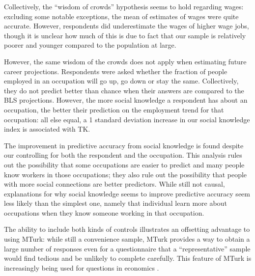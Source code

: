 \documentclass[12pt]{article}
\begin{document}
Collectively, the ``wisdom of crowds'' hypothesis seems to hold regarding wages: 
excluding some notable exceptions, the mean of estimates of wages were quite accurate. 
However, respondents did underestimate the wages of higher wage jobs,
though it is unclear how much of this is due to fact that our sample is relatively poorer and younger compared to the population at large. 


However, the same wisdom of the crowds does not apply when estimating future career projections.
Respondents were asked whether the fraction of people employed in an occupation will go up, go down or stay the same. 
Collectively, they do not predict better than chance when their answers are compared to the BLS projections. 
However, the more social knowledge a respondent has about an occupation, the better their prediction on the employment trend for that occupation: %
all else equal, a 1 standard deviation increase in our social knowledge index is associated with TK. 

The improvement in predictive accuracy from social knowledge is found despite our controlling for both the respondent and the occupation.
This analysis rules out the possibility that some occupations are easier to predict and many people know workers in those occupations; 
they also rule out the possibility that people with more social connections are better predictors.
While still not causal, explanations for why social
knowledge seems to improve predictive accuracy seem less likely than the simplest one, namely that individual learn more about occupations when they know someone working in that occupation. 


The ability to include both kinds of controls illustrates an offsetting advantage to using MTurk: 
while still a convenience sample, MTurk provides a way to obtain a large number of responses even for a questionnaire that a ``representative'' sample would find tedious and be unlikely to complete carefully.
This feature of MTurk is increasingly being used for questions in economics  \citep{kuziemko2013elastic, saez2013generalized}. 
\end{document}
